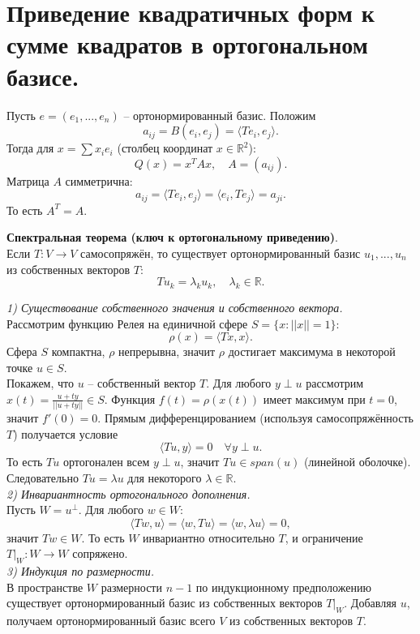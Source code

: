 \documentclass[14pt]{extreport}
\begin{document}
    \chapter{Приведение квадратичных форм к сумме квадратов в ортогональном базисе.}

    \begin{defbox}
        Пусть $e = (e_1,...,e_n)$ – ортонормированный базис. Положим
        \[
        a_{ij} = B(e_i,e_j) = \langle Te_i,e_j \rangle.
        \]
        Тогда для $x = \sum x_ie_i$ (столбец координат $x \in \mathbb{R}^2$):
        \[
        Q(x) = x^TAx, \quad A = (a_{ij}).
        \]
        Матрица $A$ симметрична:
        \[
        a_{ij} = \langle Te_i,e_j \rangle = \langle e_i, Te_j \rangle = a_{ji}.
        \]
        То есть $A^T = A$.
    \end{defbox}

    \begin{thbox}
        \textbf{Спектральная теорема (ключ к ортогональному приведению)}.\\
        Если $T: V \rightarrow V$ самосопряжён, то существует ортонормированный базис $u_1,...,u_n$ из собственных векторов $T$:
        \[
        Tu_k = \lambda_ku_k, \quad \lambda_k \in \mathbb{R}.
        \]
    \end{thbox}

    \begin{prbox}
        \textit{1) Существование собственного значения и собственного вектора.}\\
        Рассмотрим функцию Релея на единичной сфере $S = \{x: ||x|| = 1\}$:
        \[
        \rho (x) = \langle Tx,x \rangle.
        \]
        Сфера $S$ компактна, $\rho$ непрерывна, значит $\rho$ достигает максимума в некоторой точке $u \in S$.\\
        Покажем, что $u$ – собственный вектор $T$. Для любого $y \perp u$ рассмотрим $x(t) = \frac{u + ty}{||u + ty||} \in S$. Функция $f(t) = \rho(x(t))$ имеет максимум при $t=0$, значит $f'(0)=0$. Прямым дифференцированием (используя самосопряжённость $T$) получается условие
        \[
        \langle Tu,y \rangle = 0 \quad \forall y \perp u.
        \]
        То есть $Tu$ ортогонален всем $y \perp u$, значит $Tu \in span(u)$ (линейной оболочке). Следовательно $Tu = \lambda u$ для некоторого $\lambda \in \mathbb{R}$.\\
        
        \textit{2) Инвариантность ортогонального дополнения.}\\
        Пусть $W = u^\perp$. Для любого $w \in W$:
        \[
        \langle Tw,u \rangle = \langle w,Tu \rangle = \langle w, \lambda u \rangle = 0,
        \]
        значит $Tw \in W$. То есть $W$ инвариантно относительно $T$, и ограничение $T|_W: W \rightarrow W$ сопряжено.\\

        \textit{3) Индукция по размерности.}\\
        В пространстве $W$ размерности $n-1$ по индукционному предположению существует ортонормированный базис из собственных векторов $T|_W$. Добавляя $u$, получаем ортонормированный базис всего $V$ из собственных векторов $T$.
    \end{prbox}
\end{document}

